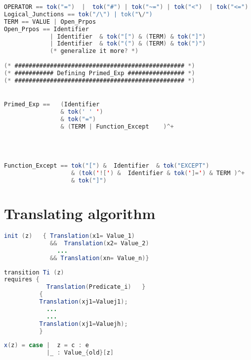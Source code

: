 \documentclass{article}
\theoremstyle{plain}
\numberwithin{equation}{section}
\begin{document}
\begin{lstlisting}[language=java]
OPERATOR == tok("=")  |  tok("#") | tok("~=") | tok("<")  | tok("<=")
Logical_Junctions == tok("/\") | tok("\/")
TERM == VALUE | Open_Prpos
Open_Prpos == Identifier    
             | Identifier  & tok("[") & (TERM) & tok("]")
             | Identifier  & tok("(") & (TERM) & tok(")")
             (* generalize it more? *)
             
(* ################################################ *)
(* ########### Defining Primed_Exp ################ *)
(* ################################################ *)


Primed_Exp ==   (Identifier 
                & tok(' ' ') 
                & tok("=")  
                & (TERM | Function_Except    )^+



             
Function_Except == tok("[") &  Identifier  & tok("EXCEPT") 
                   & (tok('![') &  Identifier & tok(']=') & TERM )^+  
                   & tok("]")

\end{lstlisting}





\section{Translating algorithm} 

\begin{lrbox}{\codebox}
   \begin{lstlisting}[language=java]
init (z)   { Translation(x1= Value_1) 
             &&  Translation(x2= Value_2) 
               ... 
             && Translation(xn= Value_n)}
\end{lstlisting}
\end{lrbox}


\begin{lrbox}{\codeboxa}
   \begin{lstlisting}[language=java]
transition Ti (z)  
requires {     
            Translation(Predicate_i)   }
          {
          Translation(xj1=Valuej1);
            ... 
            ...
          Translation(xj1=Valuejh);
          }  
\end{lstlisting}
\end{lrbox}



\begin{lrbox}{\codeboxb}
   \begin{lstlisting}[language=java]
x(z) = case |  z = c : e 
            |_ : Value_{old}[z]

\end{lstlisting}
\end{lrbox}
\end{document}
